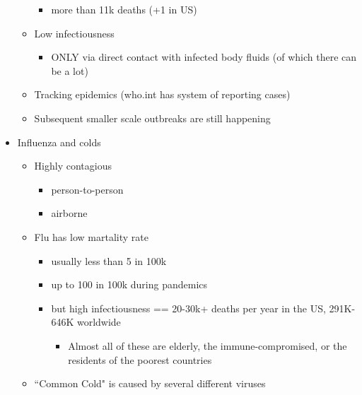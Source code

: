 \documentclass{article}
\theoremstyle{definition}
\begin{document}
\begin{itemize}
\begin{itemize}
\begin{itemize}
					\item more than 11k deaths (+1 in US)
				\end{itemize}
			\item Low infectiousness
				\begin{itemize}
					\item ONLY via direct contact with infected body fluids (of which there can be a lot)
				\end{itemize}
			\item Tracking epidemics (who.int has system of reporting cases)
			\item Subsequent smaller scale outbreaks are still happening
		\end{itemize}
	\item Influenza and colds
		\begin{itemize}
			\item Highly contagious
				\begin{itemize}
					\item person-to-person
					\item airborne
				\end{itemize}
			\item Flu has low martality rate
				\begin{itemize}
					\item usually less than 5 in 100k
					\item up to 100 in 100k during pandemics
					\item but high infectiousness == 20-30k+ deaths per year in the US, 291K-646K worldwide
						\begin{itemize}
							\item Almost all of these are elderly, the immune-compromised, or the residents of the poorest countries
						\end{itemize}
				\end{itemize}
			\item ``Common Cold" is caused by several different viruses
		\end{itemize}
\end{itemize}
\end{document}
